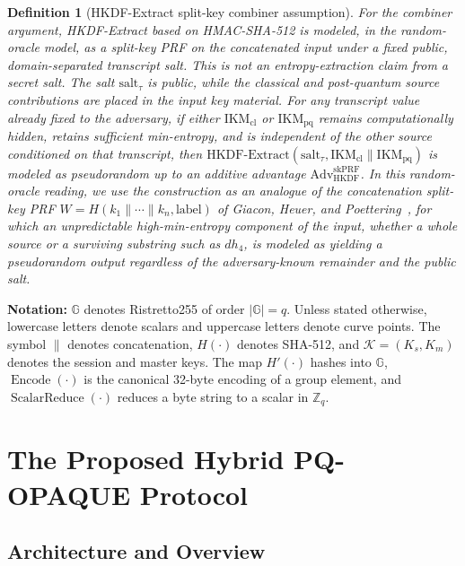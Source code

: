 \documentclass{ieeeijc}
\newtheorem{definition}{Definition}[section]
\theoremstyle{remark}
\begin{document}
\begin{definition}[HKDF-Extract split-key combiner assumption]
For the combiner argument, HKDF-Extract based on HMAC-SHA-512 is modeled, in
the random-oracle model, as
a split-key PRF on the concatenated input under a fixed public,
domain-separated transcript salt. This is not an entropy-extraction claim
from a secret salt. The salt $\mathrm{salt}_{\tau}$ is public, while the
classical and post-quantum source contributions are placed in the input key
material. For any transcript value already fixed to the adversary, if
either $\mathrm{IKM}_{\mathrm{cl}}$ or $\mathrm{IKM}_{\mathrm{pq}}$ remains
computationally hidden, retains sufficient min-entropy, and is independent
of the other source conditioned on that transcript, then
$\mathrm{HKDF\text{-}Extract}(\mathrm{salt}_{\tau},
\mathrm{IKM}_{\mathrm{cl}}\|\mathrm{IKM}_{\mathrm{pq}})$ is modeled as
pseudorandom up to an additive advantage
$\mathrm{Adv}_{\mathrm{HKDF}}^{\mathrm{skPRF}}$. In this random-oracle reading,
we use the construction as an analogue of the concatenation split-key PRF
$W = H(k_1\|\cdots\|k_n,\mathrm{label})$ of Giacon, Heuer, and
Poettering~\cite{giacon2018}, for which an unpredictable high-min-entropy
component of the input, whether a whole source or a surviving substring such as
$dh_4$, is modeled as yielding a pseudorandom output regardless of the adversary-known remainder
and the public salt.
\end{definition}

\textbf{Notation:} $\mathbb{G}$ denotes Ristretto255 of order
$|\mathbb{G}| = q$. Unless stated otherwise, lowercase letters denote scalars and uppercase letters
denote curve points. The symbol $\|$ denotes concatenation, $H(\cdot)$ denotes
SHA-512, and $\mathcal{K} = (K_s, K_m)$ denotes the session and master
keys. The map $H'(\cdot)$ hashes into $\mathbb{G}$, $\operatorname{Encode}(\cdot)$
is the canonical 32-byte encoding of a group element, and
$\operatorname{ScalarReduce}(\cdot)$ reduces a byte string to a scalar in
$\mathbb{Z}_q$.

\section{The Proposed Hybrid PQ-OPAQUE Protocol}

\subsection{Architecture and Overview}
\end{document}
